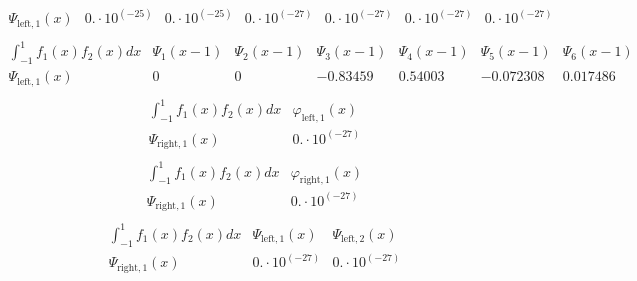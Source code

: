 \documentclass{article}
\begin{document}
\begin{landscape}
$$\begin{array}{l|llllll}
 \Psi_{\text{left},1}(x) & 0.\cdot 10^{(-25)} & 0.\cdot 10^{(-25)} & 0.\cdot 10^{(-27)} & 0.\cdot 10^{(-27)} & 0.\cdot 10^{(-27)} & 0.\cdot 10^{(-27)} \\ 
\end{array} $$ 
$$ \begin{array}{l|llllll}
\int_{-1}^1 f_1(x)f_2(x) dx& \Psi_1(x-1)& \Psi_2(x-1)& \Psi_3(x-1)& \Psi_4(x-1)& \Psi_5(x-1)& \Psi_6(x-1) \\ \hline 
 \Psi_{\text{left},1}(x) & 0 & 0 & -0.83459 & 0.54003 & -0.072308 & 0.017486 \\ 
\end{array} $$ 
$$ \begin{array}{l|l}
\int_{-1}^1 f_1(x)f_2(x) dx& \varphi_{\text{left},1}(x) \\ \hline 
 \Psi_{\text{right},1}(x) & 0.\cdot 10^{(-27)} \\ 
\end{array} $$ 
$$ \begin{array}{l|l}
\int_{-1}^1 f_1(x)f_2(x) dx& \varphi_{\text{right},1}(x) \\ \hline 
 \Psi_{\text{right},1}(x) & 0.\cdot 10^{(-27)} \\ 
\end{array} $$ 
$$ \begin{array}{l|ll}
\int_{-1}^1 f_1(x)f_2(x) dx& \Psi_{\text{left},1}(x)& \Psi_{\text{left},2}(x) \\ \hline 
 \Psi_{\text{right},1}(x) & 0.\cdot 10^{(-27)} & 0.\cdot 10^{(-27)} \\ 
\end{array} $$ 
\end{landscape}
\end{document}
